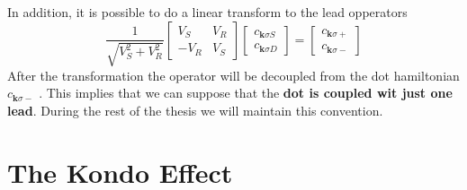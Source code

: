 In addition, it is possible to do a linear transform to the lead opperators 
\begin{equation}
    \frac{1}{\sqrt{V_{S}^{2}+V_{R}^{2}}}\left[\begin{array}{cc}
V_{S} & V_{R}\\
-V_{R} & V_{S}
\end{array}\right]\left[\begin{array}{c}
c_{\mathbf{k}\sigma S}\\
c_{\mathbf{k}\sigma D}
\end{array}\right]=\left[\begin{array}{c}
c_{\mathbf{k}\sigma+}\\
c_{\mathbf{k}\sigma-}
\end{array}\right]
\end{equation}
After the transformation the operator will be decoupled from the dot hamiltonian $c_{\mathbf{k}\sigma-}$ . This implies that we can suppose that the  \textbf{dot is coupled wit just one lead}. During the rest of the thesis we will maintain this convention. 


\section{The Kondo Effect \label{sec:Kondo} }


